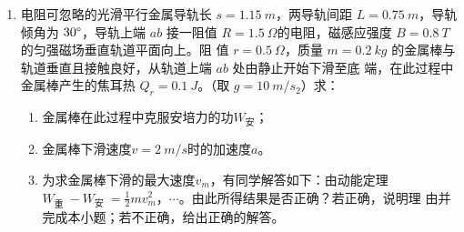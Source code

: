 \begin{enumerate}
\item 
{}
电阻可忽略的光滑平行金属导轨长 $ s=1.15 \ m $，两导轨间距 $ L=0.75 \ m $，导轨倾角为
$ 30 \degree $，导轨上端 $ ab $ 接一阻值 $ R=1.5 \ \Omega $的电阻，磁感应强度 $ B=0.8 \ T $ 的匀强磁场垂直轨道平面向上。阻
值 $ r=0.5 \ \Omega $，质量 $ m=0.2 \ kg $ 的金属棒与轨道垂直且接触良好，从轨道上端 $ ab $ 处由静止开始下滑至底
端，在此过程中金属棒产生的焦耳热 $ Q_{r}=0.1 \ J $。（取 $ g=10 \ m / s_{2} $）求：
\begin{enumerate}
\item
金属棒在此过程中克服安培力的功$ W_{ \text{安} } $；


\item 
金属棒下滑速度$ v=2 \ m /s $时的加速度$ a $。

\item 
为求金属棒下滑的最大速度$ v_{m} $，有同学解答如下：由动能定理
$W_{\text {重 }}-W_{\text {安 }}=\frac{1}{2} m v_{m}^{2}$，$ \cdots $。由此所得结果是否正确？若正确，说明理
由并完成本小题；若不正确，给出正确的解答。



\end{enumerate}
\begin{figure}[h!]
\flushright

\end{figure}




\end{enumerate}
